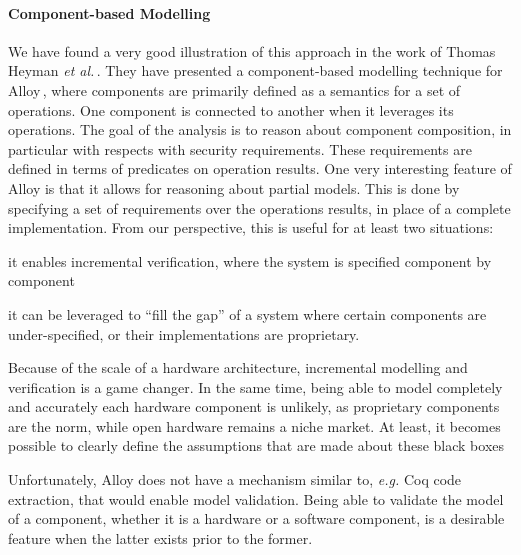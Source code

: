 \paragraph{Component-based Modelling}
%
We have found a very good illustration of this approach in the work of Thomas
Heyman \emph{et al.}\,\cite{heyman2012securemodel}.
%
They have presented a component-based modelling technique for
Alloy\,\cite{jackson2012alloy}, where components are primarily defined as a
semantics for a set of operations.
%
One component is connected to another when it leverages its operations.
%
The goal of the analysis is to reason about component composition, in particular
with respects with security requirements.
%
These requirements are defined in terms of predicates on operation results.
%
One very interesting feature of Alloy is that it allows for reasoning about
partial models.
%
This is done by specifying a set of requirements over the operations results, in
place of a complete implementation.
%
From our perspective, this is useful for at least two situations:
%
\begin{inparaenum}[(1)]
\item it enables incremental verification, where the system is specified
  component by component
%
\item it can be leveraged to ``fill the gap'' of a system where certain
  components are under-specified, or their implementations are proprietary.
%
\end{inparaenum}
%
Because of the scale of a hardware architecture, incremental modelling and
verification is a game changer.
%
In the same time, being able to model completely and accurately each hardware
component is unlikely, as proprietary components are the norm, while open
hardware remains a niche market.
%
At least, it becomes possible to clearly define the assumptions that are made
about these black boxes

Unfortunately, Alloy does not have a mechanism similar to, \emph{e.g.} Coq code
extraction, that would enable model validation.
%
Being able to validate the model of a component, whether it is a hardware or a
software component, is a desirable feature when the latter exists prior to the
former.

